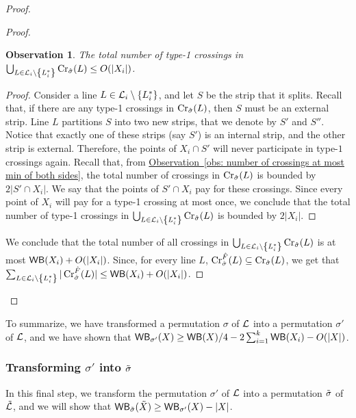 \documentclass[11pt]{article}
\numberwithin{equation}{section}
\theoremstyle{definition}
\theoremstyle{plain}
\newcommand{\expref}[2]{\hyperref[#2]{#1~\ref{#2}}}
\newtheorem{myobs}[theorem]{Observation}
\begin{document}
\begin{proof}
\begin{proof}
		
		\begin{myobs}\label{obs: type 1 crossings}
			The total number of type-1 crossings in $\bigcup_{L\in {\mathcal L}_i\setminus\left\{ L_i^* \right\}}\operatorname{Cr}_{\hat{\sigma}}(L)\leq O(|X_i|)$.
		\end{myobs}
		\begin{proof}
			Consider a line $L\in {\mathcal L}_i\setminus\left\{ L_i^* \right\}$, and let $S$ be the strip that it splits. Recall that, if there are any type-1 crossings in $\operatorname{Cr}_{\hat{\sigma}}(L)$, then $S$ must be an external strip. Line $L$ partitions $S$ into two new strips, that we denote by $S'$ and $S''$. Notice that exactly one of these strips (say $S'$) is an internal strip, and the other strip is external. Therefore, the points of $X_i\cap S'$ will never participate in type-$1$ crossings again. Recall that, from \expref{Observation}{obs: number of crossings at most min of both sides}, the total number of crossings in $\operatorname{Cr}_{\hat{\sigma}}(L)$ is bounded by $2|S'\cap X_i|$. We say that the points of $S'\cap X_i$ pay for these crossings. Since every point of $X_i$ will pay for a type-1 crossing at most once, we conclude that the total number of type-1 crossings in $\bigcup_{L\in {\mathcal L}_i\setminus\left\{ L_i^* \right\}}\operatorname{Cr}_{\hat{\sigma}}(L)$ is bounded by $2|X_i|$.
		\end{proof}
		
		We conclude that the total number of all crossings in $\bigcup_{L\in {\mathcal L}_i\setminus\left\{ L_i^* \right\}}\operatorname{Cr}_{\hat{\sigma}}(L)$ is at most $\mathsf{WB}(X_i)+O(|X_i|)$. Since, for every line $L$, $\operatorname{Cr}_{\hat{\sigma}}^{\hat F}(L)\subseteq \operatorname{Cr}_{\hat{\sigma}}(L)$, we get that $\sum_{L\in {\mathcal L}_i\setminus\left\{ L_i^* \right\}}|\operatorname{Cr}^{\hat F}_{\hat{\sigma}}(L)|\leq \mathsf{WB}(X_i)+O(|X_i|)$.
	\end{proof}			
\end{proof}


To summarize, we have transformed a permutation $\sigma$ of ${\mathcal L}$ into a permutation $\sigma'$ of ${\mathcal L}$, and we have shown that  $\mathsf{WB}_{\sigma'}(X)\geq \mathsf{WB}(X)/4-2\sum_{i=1}^k\mathsf{WB}(X_i)-O(|X|)$.


\subsubsection{Transforming $\sigma'$ into $\tilde{\sigma}$}


In this final step, we transform the permutation $\sigma'$ of ${\mathcal L}$ into a permutation $\tilde{\sigma}$ of $\tilde{\mathcal{L}}$, and we will show that $\mathsf{WB}_{\tilde{\sigma}}(\tilde X)\geq \mathsf{WB}_{\sigma'}(X)-|X|$.
\end{document}
